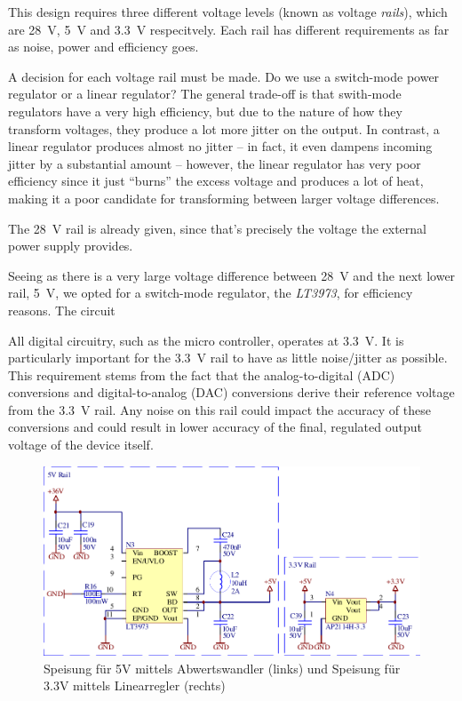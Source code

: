 This  design  requires   three   different  voltage  levels  (known  as  voltage
\emph{rails}),  which  are  \SI{28}{\volt},  \SI{5}{\volt}  and  \SI{3.3}{\volt}
respecitvely. Each rail has  different  requirements  as far as noise, power and
efficiency goes.

A  decision  for  each  voltage rail must be made. Do we use a switch-mode power
regulator  or a linear regulator?  The  general  trade-off  is  that  swith-mode
regulators have  a  very  high  efficiency,  but  due  to the nature of how they
transform voltages, they produce a lot more jitter on the output. In contrast, a
linear regulator produces almost  no jitter -- in fact, it even dampens incoming
jitter  by  a substantial amount -- however, the linear regulator has very  poor
efficiency since  it  just  ``burns''  the  excess voltage and produces a lot of
heat,  making  it  a  poor  candidate  for transforming between  larger  voltage
differences.

The \SI{28}{\volt} rail is already given, since that's precisely the voltage the
external power supply provides.

Seeing as there  is  a  very large voltage difference between \SI{28}{\volt} and
the next lower rail, \SI{5}{\volt}, we opted for  a  switch-mode  regulator, the
\emph{LT3973}, for efficiency reasons. The circuit 

All   digital   circuitry,   such  as  the   micro   controller,   operates   at
\SI{3.3}{\volt}. It  is  particularly  important for the \SI{3.3}{\volt} rail to
have as little noise/jitter as possible. This requirement  stems  from  the fact
that  the  analog-to-digital   (ADC)  conversions  and  digital-to-analog  (DAC)
conversions derive  their  reference  voltage from the \SI{3.3}{\volt} rail. Any
noise on  this  rail  could  impact  the accuracy of these conversions and could
result in  lower  accuracy  of the final, regulated output voltage of the device
itself. 

\begin{figure}[th!]
    \center
    \includegraphics[width=.75\textwidth]{images/circuit/5v-3v-rails.pdf}
    \caption{Speisung f\"ur 5V mittels Abwertswandler (links) und Speisung f\"ur 3.3V mittels Linearregler (rechts)}
    \label{fig:circuit:rails}
\end{figure}

